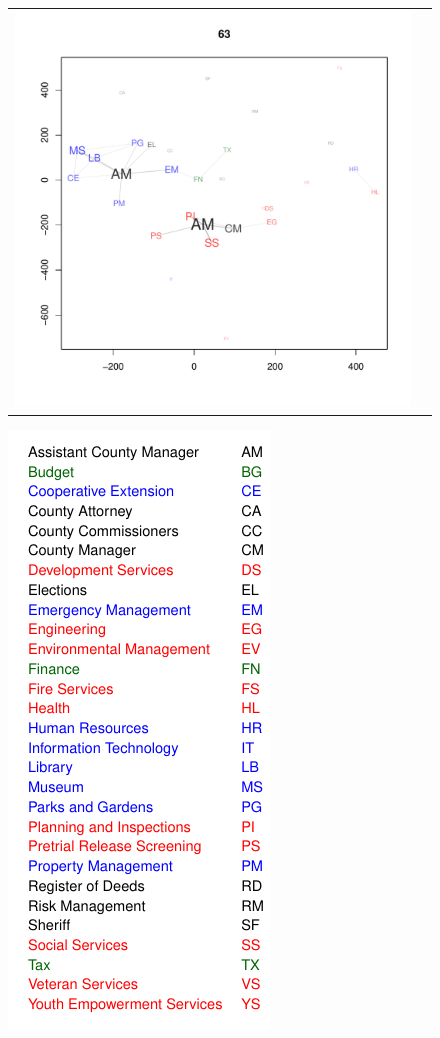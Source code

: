 \begin{figure}[t]
\begin{minipage}[b]{0.5\linewidth}
\begin{tabular}{cc}
 \includegraphics[scale=.29, trim=.4in .6in .4in .8in, clip=true]{latent_space_63} \\
\end{tabular}
\end{minipage}
\begin{minipage}{0.5\linewidth}
\hspace{3.25cm}\vspace{-0.4cm} \includegraphics[scale=.85]{department_key}

\end{minipage}
\end{figure}
